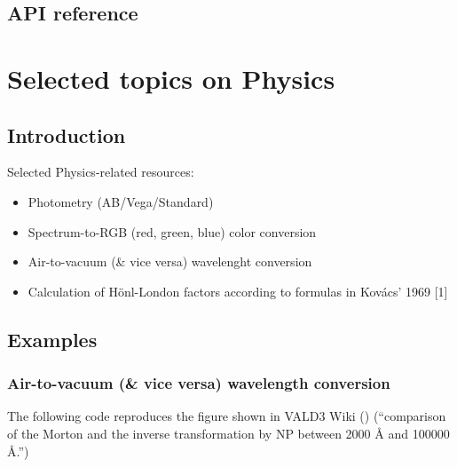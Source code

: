 \documentclass[letterpaper,10pt,english]{sphinxmanual}
\begin{document}
\section{API reference}
\label{\detokenize{filetypes:api-reference}}


\chapter{Selected topics on Physics}
\label{\detokenize{physics::doc}}\label{\detokenize{physics:selected-topics-on-physics}}

\section{Introduction}
\label{\detokenize{physics:introduction}}
Selected Physics-related resources:
\begin{itemize}
\item {} 
Photometry (AB/Vega/Standard)

\item {} 
Spectrum-to-RGB (red, green, blue) color conversion

\item {} 
Air-to-vacuum (\& vice versa) wavelenght conversion

\item {} 
Calculation of Hönl-London factors according to formulas in Kovács’ 1969 {[}1{]}

\end{itemize}


\section{Examples}
\label{\detokenize{physics:examples}}

\subsection{Air-to-vacuum (\& vice versa) wavelength conversion}
\label{\detokenize{physics:air-to-vacuum-vice-versa-wavelength-conversion}}
The following code reproduces the figure
shown in VALD3 Wiki ()
(“comparison of the Morton and the inverse transformation by NP between 2000 Å and 100000 Å.”)
\end{document}
